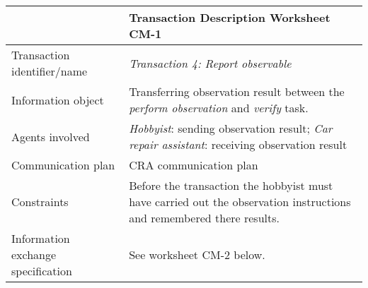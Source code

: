 \noindent
\begin{tabular}{%
       |>{\colleft}p{3cm}%
       |>{\colleft}p{8.5cm}|}
\hline
{\bf Communication model} &
   {\bf Transaction Description Worksheet CM-1} \\
\hline
\hline
\sc Transaction identifier/name &
	\emph{Transaction 4: Report observable} \\

\hline
\sc Information object &
	Transferring observation result between the \emph{perform observation} and \emph{verify} task. \\
\hline
\sc Agents involved &
	\emph{Hobbyist}: sending observation result;			\newline
	\emph{Car repair assistant}: receiving observation result	\\
\hline
\sc Communication plan &
	CRA communication plan\\

\hline
\sc Constraints &
	Before the transaction the hobbyist must have carried out the observation instructions and remembered there results.\\
\hline
\sc Information exchange specification &
	See worksheet CM-2 below.\\

\hline
\end{tabular}


